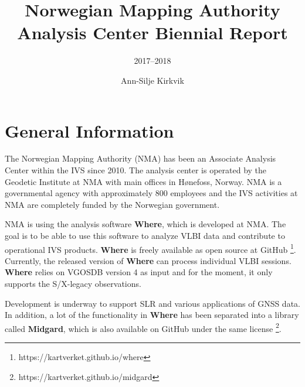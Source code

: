 \documentclass[twocolumn,twoside]{svmultivs_br} %
\title*{Norwegian Mapping Authority Analysis Center Biennial Report}
\subtitle{2017--2018}
\author{Ann-Silje Kirkvik}
\institute{Norwegian Mapping Authority (NMA)}
\begin{document}
%
\maketitle   %
%

%
\section{General Information}
The Norwegian Mapping Authority (NMA) has been an Associate Analysis Center within the IVS since 2010. The analysis
center is operated by the Geodetic Institute at NMA with main offices in H\o nefoss, Norway. NMA is a governmental agency with approximately 800 employees
and the IVS activities at NMA are completely funded by the Norwegian government.

NMA is using the analysis software \textbf{Where}, which is developed at NMA. The goal is to be able to use this
software to analyze VLBI data and contribute to operational IVS products. \textbf{Where} is freely available as open
source at GitHub \footnote{https://kartverket.github.io/where}.
Currently, the released version of \textbf{Where} can process individual VLBI sessions. \textbf{Where}
relies on VGOSDB version 4 as input and for the moment, it only supports the S/X-legacy observations.

Development is underway to support SLR and various applications of GNSS data. In addition, a lot of the functionality in
\textbf{Where} has been separated into a library called \textbf{Midgard}, which is also available on GitHub under the
same license \footnote{https://kartverket.github.io/midgard}.
\end{document}
